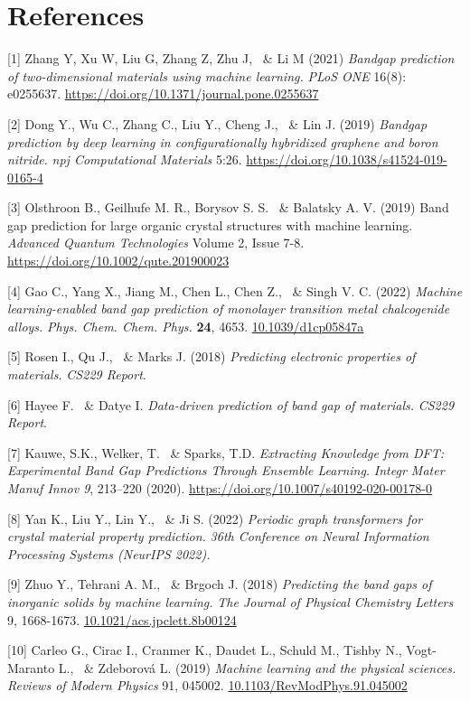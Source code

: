\documentclass{article}
\begin{document}
\newpage

\section*{References}


{
\small


[1] Zhang Y, Xu W, Liu G, Zhang Z, Zhu J, \ \& Li M (2021) {\it Bandgap prediction of two-dimensional materials using machine learning.} {\it PLoS ONE} 16(8): e0255637. \url{https://doi.org/10.1371/journal.pone.0255637}


[2] Dong Y., Wu C., Zhang C., Liu Y., Cheng J., \ \& Lin J. (2019) {\it Bandgap prediction by deep learning in configurationally
hybridized graphene and boron nitride.} {\it npj Computational Materials} 5:26. \url{https://doi.org/10.1038/s41524-019-0165-4}


[3] Olsthroon B., Geilhufe M. R., Borysov S. S. \ \& Balatsky A. V. (2019) {Band gap prediction for large organic crystal structures with machine learning.} {\it Advanced Quantum Technologies} Volume 2, Issue 7-8. \url{https://doi.org/10.1002/qute.201900023}

[4] Gao C., Yang X., Jiang M., Chen L., Chen Z., \ \& Singh V. C. (2022) {\it Machine learning-enabled band gap prediction of monolayer transition metal chalcogenide alloys.} {\it Phys. Chem. Chem. Phys.} {\bf 24}, 4653. \url{10.1039/d1cp05847a}

[5] Rosen I., Qu J., \ \& Marks J. (2018) {\it Predicting electronic properties of materials.} {\it CS229 Report}.

[6] Hayee F. \ \& Datye I. {\it Data-driven prediction of band gap of materials.} {\it CS229 Report}.

[7] Kauwe, S.K., Welker, T. \ \& Sparks, T.D. {\it Extracting Knowledge from DFT: Experimental Band Gap Predictions Through Ensemble Learning.} {\it Integr Mater Manuf Innov 9}, 213–220 (2020). \url{https://doi.org/10.1007/s40192-020-00178-0}

[8] Yan K., Liu Y., Lin Y., \ \& Ji S. (2022) {\it Periodic graph transformers for crystal material property prediction.} {\it 36th Conference on Neural Information Processing Systems (NeurIPS 2022).} 

[9] Zhuo Y., Tehrani A. M., \ \& Brgoch J. (2018) {\it Predicting the band gaps of inorganic solids by machine learning.} {\it The Journal of Physical Chemistry Letters} 9, 1668-1673. \url{10.1021/acs.jpclett.8b00124}

[10] Carleo G., Cirac I., Cranmer K., Daudet L., Schuld M., Tishby N., Vogt-Maranto L., \ \& Zdeborová L. (2019) {\it Machine learning and the physical sciences.} {\it Reviews of Modern Physics} 91, 045002. \url {10.1103/RevModPhys.91.045002}

}
\end{document}
